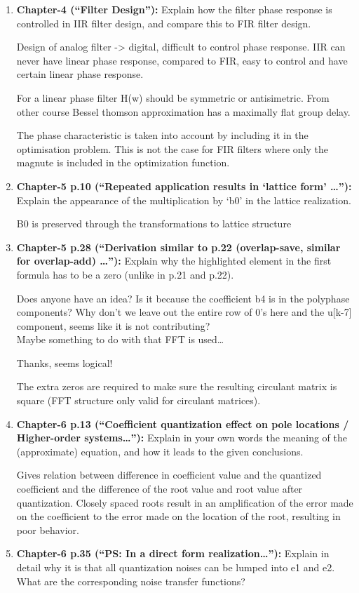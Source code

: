 \documentclass[
  a4paper,
  ,captions=tableheading
]{scrartcl}
\begin{document}
\begin{enumerate}
\def\labelenumi{\arabic{enumi}.}
\item
  \textbf{Chapter-4 (``Filter Design''):} Explain how the filter phase
  response is controlled in IIR filter design, and compare this to FIR
  filter design.

  Design of analog filter -\textgreater{} digital, difficult to control
  phase response. IIR can never have linear phase response, compared to
  FIR, easy to control and have certain linear phase response.

  For a linear phase filter H(w) should be symmetric or antisimetric.
  From other course Bessel thomson approximation has a maximally flat
  group delay.

  The phase characteristic is taken into account by including it in the
  optimisation problem. This is not the case for FIR filters where only
  the magnute is included in the optimization function.
\item
  \textbf{Chapter-5 p.10 (``Repeated application results in `lattice
  form' \ldots''):} Explain the appearance of the multiplication by `b0'
  in the lattice realization.

  B0 is preserved through the transformations to lattice structure
\item
  \textbf{Chapter-5 p.28 (``Derivation similar to p.22 (overlap-save,
  similar for overlap-add) \ldots''):} Explain why the highlighted
  element in the first formula has to be a zero (unlike in p.21 and
  p.22).

  Does anyone have an idea? Is it because the coefficient b4 is in the
  polyphase components? Why don't we leave out the entire row of 0's
  here and the u{[}k-7{]} component, seems like it is not
  contributing?\\
  Maybe something to do with that FFT is used\ldots{}

  Thanks, seems logical!

  The extra zeros are required to make sure the resulting circulant
  matrix is square (FFT structure only valid for circulant matrices).
\item
  \textbf{Chapter-6 p.13 (``Coefficient quantization effect on pole
  locations / Higher-order systems\ldots''):} Explain in your own words
  the meaning of the (approximate) equation, and how it leads to the
  given conclusions.

  Gives relation between difference in coefficient value and the
  quantized coefficient and the difference of the root value and root
  value after quantization. Closely spaced roots result in an
  amplification of the error made on the coefficient to the error made
  on the location of the root, resulting in poor behavior.
\item
  \textbf{Chapter-6 p.35 (``PS: In a direct form realization\ldots''):}
  Explain in detail why it is that all quantization noises can be lumped
  into e1 and e2. What are the corresponding noise transfer functions?


\end{enumerate}
\end{document}
